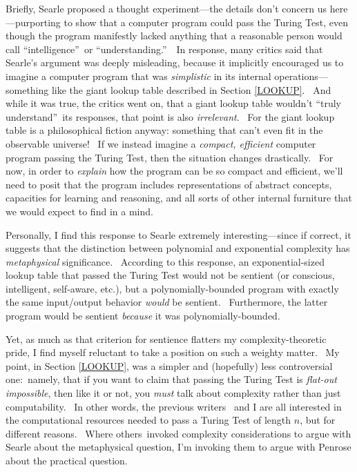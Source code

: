 \documentclass[12pt,onecolumn]{article}%
\begin{document}
Briefly, Searle proposed a thought experiment---the details don't concern us
here---purporting to show that a computer program could pass the Turing Test,
even though the program manifestly lacked anything that a reasonable person
would call \textquotedblleft intelligence\textquotedblright\ or
\textquotedblleft understanding.\textquotedblright\ \ In response, many
critics said that Searle's argument was deeply misleading, because it
implicitly encouraged us to imagine a computer program that was
\textit{simplistic} in its internal operations---something like the giant
lookup table described in Section \ref{LOOKUP}. \ And while it was true, the
critics went on, that a giant lookup table wouldn't \textquotedblleft truly
understand\textquotedblright\ its responses, that point is also
\textit{irrelevant}. \ For the giant lookup table is a philosophical fiction
anyway: something that can't even fit in the observable universe! \ If we
instead imagine a \textit{compact, efficient} computer program passing the
Turing Test, then the situation changes drastically. \ For now, in order to
\textit{explain} how the program can be so compact and efficient, we'll need
to posit that the program includes representations of abstract concepts,
capacities for learning and reasoning, and all sorts of other internal
furniture that we would expect to find in a mind.

Personally, I find this response to Searle extremely interesting---since if
correct, it suggests that the distinction between polynomial and exponential
complexity has \textit{metaphysical} significance. \ According to this
response, an exponential-sized lookup table that passed the Turing Test would
not be sentient (or conscious, intelligent, self-aware, etc.), but a
polynomially-bounded program with exactly the same input/output behavior
\textit{would} be sentient. \ Furthermore, the latter program would be
sentient \textit{because} it was polynomially-bounded.

Yet, as much as that criterion for sentience flatters my complexity-theoretic
pride, I find myself reluctant to take a position on such a weighty matter.
\ My point, in Section \ref{LOOKUP}, was a simpler and (hopefully) less
controversial one:\ namely, that if you want to claim that passing the Turing
Test is \textit{flat-out impossible}, then like it or not, you \textit{must}
talk about complexity rather than just computability. \ In other words, the
previous writers \cite{block,parberry,levesque,shieber}\ and I are all
interested in the computational resources needed to pass a Turing Test of
length $n$, but for different reasons. \ Where others\ invoked complexity
considerations to argue with Searle about the metaphysical question, I'm
invoking them to argue with Penrose about the practical question.
\end{document}
